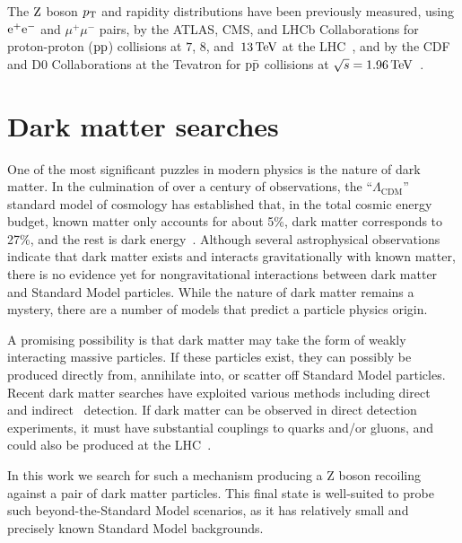 The $\mathrm{Z}$ boson $p_{\mathrm{T}}$ and rapidity distributions have been previously 
measured, using $\mathrm{e}^+\mathrm{e}^-$ and $\mu^+\mu^-$ pairs, by the ATLAS, CMS, and 
LHCb Collaborations for proton-proton ($\mathrm{p}\mathrm{p}$) collisions at $7$, $8$, 
and~$13\,\text{Te\hspace{-.08em}V}$ at the LHC~\cite{ATLAS_ZpT7TeV,ATLAS_ZptEta7TeV,Aad:2015auj,Aaboud:2016btc,Sirunyan:2018owv,CMS_ZpT7TeV,CMS_ZpT8TeV,CMS:2014jea,Khachatryan:2016nbe,LHCb_WZ7TeV,LHCb_Zee7TeV,LHCb_ZpT7TeV,LHCb_WZ8TeV,Aaij:2016mgv}, 
and by the CDF and D0 Collaborations at the Tevatron for $\mathrm{p}\bar{\mathrm{p}}$ 
collisions at $\sqrt{s} = 1.96\,\text{Te\hspace{-.08em}V}$~\cite{Affolder:1999jh,Abbott:1999yd,TevatronWZ:D0PhysRevLett2008_100,TevatronWZ:D0PhysLettB2010_693,TevatronWZ:D0PhysRevLett2011_106}. 

\section{Dark matter searches}

One of the most significant puzzles in modern physics is the nature of dark matter.
In the culmination of over a century of observations, the ``$\Lambda_{\mathrm{CDM}}$'' standard model of cosmology
has established that, in the total cosmic energy budget,
known matter only accounts for about 5\%, dark matter corresponds to 27\%, and the rest is dark energy~\cite{Hinshaw_2013}.
Although several astrophysical observations indicate that dark matter exists and interacts gravitationally with known matter,
there is no evidence yet for nongravitational interactions between dark matter and Standard Model particles.
While the nature of dark matter remains a mystery, there are a number of models that predict a particle physics origin. 

A promising possibility is that dark matter may take the form of weakly interacting massive particles.
If these particles exist, they can possibly be produced directly from, annihilate into, or scatter off Standard Model particles.
Recent dark matter searches have exploited various methods including direct~\cite{Cushman:2013zza} and indirect~\cite{Buckley:2013bha} detection.
If dark matter can be observed in direct detection experiments,
it must have substantial couplings to quarks and/or gluons, and could also be produced at the LHC~\cite{Beltran:2010ww,Goodman:2010yf,Bai:2010hh,Goodman:2010ku,Fox:2011pm,Rajaraman:2011wf}.

In this work we search for such a mechanism producing a Z boson recoiling against a pair of dark matter particles.
This final state is well-suited to probe such beyond-the-Standard Model scenarios, as
it has relatively small and precisely known Standard Model backgrounds.


